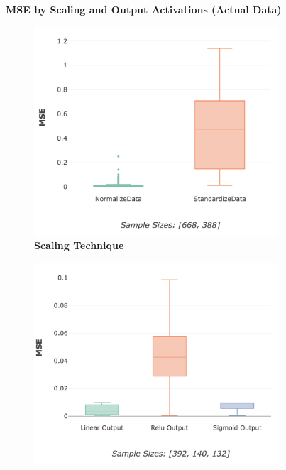 \documentclass[a4paper,11pt,oneside]{article}
\theoremstyle{plain}
\theoremstyle{definition}
\begin{document}
\begin{figure}[H]
	\centering
	\textbf{MSE by Scaling and Output Activations (Actual Data)}
	\begin{subfigure}{.5\textwidth}
		\centering 
		\includegraphics[scale=0.32]{images/results/activations/actual_mse_scaling.png}
		\caption[MSE by Scaling and Output Activations (Actual Data) - Scaling Technique]{\textbf{Scaling Technique} 
			\newline }
		\label{figure-actual_mse_scaling}
	\end{subfigure}%
	\begin{subfigure}{.5\textwidth}
		\centering 
		\includegraphics[scale=0.32]{images/results/activations/actual_mse_output.png}

\end{subfigure}
\end{figure}
\end{document}
